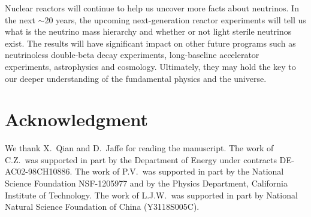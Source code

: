 \documentclass[aps,twocolumn,preprintnumbers,amsmath,superscriptaddress,amssymb,floats,nofootinbib]{revtex4-1}
\begin{document}
Nuclear reactors will continue to help us uncover more facts about neutrinos. In the next $\sim$20 years, the upcoming next-generation reactor experiments will tell us what is the neutrino mass hierarchy and whether or not light sterile neutrinos exist. The results will have significant impact on other future programs such as neutrinoless double-beta decay experiments, long-baseline accelerator experiments, astrophysics and cosmology. Ultimately, they may hold the key to our deeper understanding of the fundamental physics and the universe.

\vspace{12pt}
\section*{Acknowledgment}
We thank X.~Qian and D.~Jaffe for reading the manuscript.
The work of C.Z.~was supported in part by the Department of Energy under contracts DE-AC02-98CH10886.
The work of P.V.~was supported in part by the National Science Foundation NSF-1205977 and by the Physics Department, California Institute of Technology.
The work of L.J.W.~was supported in part by National Natural Science Foundation of China (Y3118S005C).

% 
% 
\end{document}
